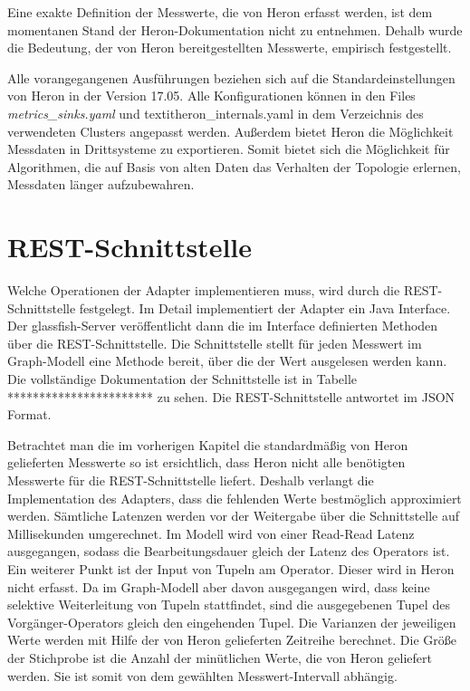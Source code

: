 Eine exakte Definition der Messwerte, die von Heron erfasst werden, ist dem momentanen Stand der Heron-Dokumentation nicht zu entnehmen. 
Dehalb wurde die Bedeutung, der von Heron bereitgestellten Messwerte, empirisch festgestellt.

Alle vorangegangenen Ausführungen beziehen sich auf die Standardeinstellungen von Heron in der Version 17.05.
Alle Konfigurationen können in den Files \textit{metrics\_sinks.yaml} und textit{heron\_internals.yaml} in dem Verzeichnis des verwendeten Clusters angepasst werden. 
Außerdem bietet Heron die Möglichkeit Messdaten in Drittsysteme zu exportieren.
Somit bietet sich die Möglichkeit für Algorithmen, die auf Basis von alten Daten das Verhalten der Topologie erlernen, Messdaten länger aufzubewahren.

\section{REST-Schnittstelle}

Welche Operationen der Adapter implementieren muss, wird durch die REST-Schnittstelle festgelegt.
Im Detail implementiert der Adapter ein Java Interface.
Der glassfish-Server veröffentlicht dann die im Interface definierten Methoden über die REST-Schnittstelle.
Die Schnittstelle stellt für jeden Messwert im Graph-Modell eine Methode bereit, über die der Wert ausgelesen werden kann.
Die vollständige Dokumentation der Schnittstelle ist in Tabelle *********************** zu sehen.
Die REST-Schnittstelle antwortet im JSON Format.

Betrachtet man die im vorherigen Kapitel die standardmäßig von Heron gelieferten Messwerte so ist ersichtlich, dass Heron nicht alle benötigten Messwerte für die REST-Schnittstelle liefert.
Deshalb verlangt die Implementation des Adapters, dass die fehlenden Werte bestmöglich approximiert werden.
Sämtliche Latenzen werden vor der Weitergabe über die Schnittstelle auf Millisekunden umgerechnet.
Im Modell wird von einer Read-Read Latenz ausgegangen, sodass die Bearbeitungsdauer gleich der Latenz des Operators ist.
Ein weiterer Punkt ist der Input von Tupeln am Operator.
Dieser wird in Heron nicht erfasst.
Da im Graph-Modell aber davon ausgegangen wird, dass keine selektive Weiterleitung von Tupeln stattfindet, sind die ausgegebenen Tupel des Vorgänger-Operators gleich den eingehenden Tupel.
Die Varianzen der jeweiligen Werte werden mit Hilfe der von Heron gelieferten Zeitreihe berechnet.
Die Größe der Stichprobe ist die Anzahl der minütlichen Werte, die von Heron geliefert werden.
Sie ist somit von dem gewählten Messwert-Intervall abhängig.


